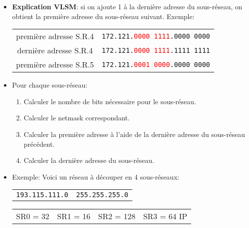 \documentclass[a4paper]{article}
\begin{document}
\begin{itemize}
    \item \textbf{Explication VLSM}: si on ajoute 1 à la dernière adresse du sous-réseau, on obtient la première adresse du sous-réseau suivant. Exemple:
    \begin{center}
        \begin{tabular}{cc}
            première adresse S.R.4 & \texttt{172.121.\textcolor{red}{0000 1111}.0000 0000} \\
            dernière adresse S.R.4 & \texttt{172.121.\textcolor{red}{0000 1111}.1111 1111} \\
            première adresse S.R.5 & \texttt{172.121.\textcolor{red}{0001 0000}.0000 0000}
        \end{tabular}
    \end{center}
    \item Pour chaque sous-réseau:
    \begin{enumerate}
        \item Calculer le nombre de bits nécessaire pour le sous-réseau.
        \item Calculer le netmask correspondant.
        \item Calculer la première adresse à l'aide de la dernière adresse du sous-réseau précédent.
        \item Calculer la dernière adresse du sous-réseau.
    \end{enumerate}
    \item Exemple: Voici un réseau à découper en 4 sous-réseaux:
    \begin{center}
        \begin{tabular}{cc}
            \texttt{193.115.111.0} & \texttt{255.255.255.0}
        \end{tabular}
    
        \begin{tabular}{c|c|c|c}
            SR0 = 32 & SR1 = 16 & SR2 = 128 & SR3 = 64 IP
        \end{tabular}
    \end{center}
    

\end{itemize}
\end{document}
